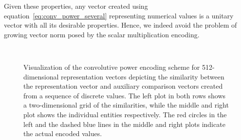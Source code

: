 Given these properties, any vector created using equation~\eqref{eq:conv_power_several} representing numerical values is a unitary vector with all its desirable properties.
Hence, we indeed avoid the problem of growing vector norm posed by the scalar multiplication encoding.

\begin{figure}[t]
    \centering
    \\
    \caption{
        Visualization of the convolutive power encoding scheme for \num{512}-dimensional representation vectors depicting the similarity between the representation vector and auxiliary comparison vectors created from a sequence of discrete values.
        The left plot in both rows shows a two-dimensional grid of the similarities, while the middle and right plot shows the individual entities respectively.
        The red circles in the left and the dashed blue lines in the middle and right plots indicate the
    actual encoded values.}
    \label{fig:spa_power_encoding}
\end{figure}

